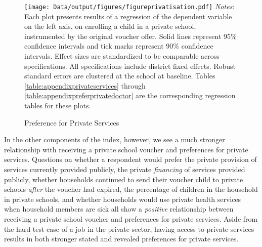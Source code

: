 \documentclass[hidelinks, 12pt, titlepage]{article}
\begin{document}
\begin{figure}[htbp]
    \caption{Preference for Private Services\label{fig:privatisation}}
    \centering
    \begin{minipage}{5.5in}
        \texttt{[image: Data/output/figures/figureprivatisation.pdf]}
        \footnotesize
        \emph{Notes}: Each plot presents results of a regression of the dependent variable on the left axis, on enrolling a child in a private school, instrumented by the original voucher offer.  Solid lines represent 95\% confidence intervals and tick marks represent 90\% confidence intervals.  Effect sizes are standardized to be comparable across specifications.  All specifications include district fixed effects.  Robust standard errors are clustered at the school at baseline. Tables \ref{table:appendixprivateservices} through \ref{table:appendixpreferprivatedoctor} are the corresponding regression tables for these plots.
    \end{minipage}
\end{figure}

In the other components of the index, however, we see a much stronger relationship with receiving a private school voucher and preferences for private services.  Questions on whether a respondent would prefer the private provision of services currently provided publicly, the private \emph{financing} of services provided publicly, whether households continued to send their voucher child to private schools \emph{after} the voucher had expired, the percentage of children in the household in private schools, and whether households would use private health services when household members are sick all show a \emph{positive} relationship between receiving a private school voucher and preferences for private services.  Aside from the hard test case of a job in the private sector, having access to private services results in both stronger stated and revealed preferences for private services.
\end{document}
